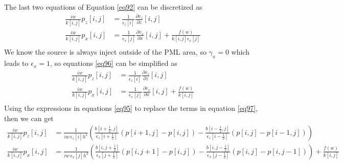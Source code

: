 \documentclass[revised,endfloat]{geophysics}
\begin{document}
The last two equations of Equation \ref{eq92} can be discretized as
\begin{equation}
\begin{split}
\frac{iw}{k[i,j]} p_z[i,j] &= \frac{1}{\epsilon_z[i]} \frac{\partial v_z}{\partial z}[i,j]       \\
\frac{iw}{k[i,j]} p_x[i,j] &= \frac{1}{\epsilon_x[j]} \frac{\partial v_x}{\partial x}[i,j] + \frac{f(w)}{k[i,j] \epsilon_x[j]}\\
\end{split}
\label{eq96}
\end{equation}
We know the source is always inject outside of the PML area, so $\gamma_x = 0$ which leads to $\epsilon_x = 1$, so equations \ref{eq96} can be simplified as 
\begin{equation}
\begin{split}
\frac{iw}{k[i,j]} p_z[i,j] &= \frac{1}{\epsilon_z[i]} \frac{\partial v_z}{\partial z}[i,j]       \\
\frac{iw}{k[i,j]} p_x[i,j] &= \frac{1}{\epsilon_x[j]} \frac{\partial v_x}{\partial x}[i,j] + \frac{f(w)}{k[i,j]}\\
\end{split}
\label{eq97}
\end{equation}
Using the expressions in equations \ref{eq95} to replace the terms in equation \ref{eq97}, then we can get
\begin{equation}
\begin{split}
\frac{iw}{k[i,j]} p_z[i,j] &= \frac{1}{iw\, \epsilon_z[i] h^2} \left(  \frac{b[i+\frac{1}{2},j]}{\epsilon_z[i+\frac{1}{2}]} (p[i+1,j] - p[i,j]) - \frac{b[i-\frac{1}{2},j]}{\epsilon_z[i-\frac{1}{2}]} (p[i,j] - p[i-1,j])  \right)       \\
\frac{iw}{k[i,j]} p_x[i,j] &= \frac{1}{iw \, \epsilon_x[j] h^2} \left( \frac{b[i,j+\frac{1}{2}]}{\epsilon_x[j+\frac{1}{2}]} (p[i,j+1] - p[i,j])   -   \frac{b[i,j-\frac{1}{2}]}{\epsilon_x[j-\frac{1}{2}]} (p[i,j] - p[i,j-1]) \right) + \frac{f(w)}{k[i,j]}\\
\end{split} 
\label{eq98}
\end{equation}
\end{document}
